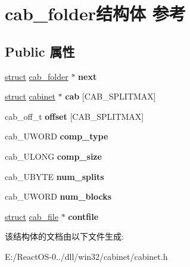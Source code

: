 \hypertarget{structcab__folder}{}\section{cab\+\_\+folder结构体 参考}
\label{structcab__folder}
\subsection*{Public 属性}
\begin{DoxyCompactItemize}
\item 
\mbox{\label{structcab__folder_a7cecba557234bb4262b10ebe0d312d08}} 
\hyperlink{interfacestruct}{struct} \hyperlink{structcab__folder}{cab\+\_\+folder} $\ast$ {\bfseries next}
\item 
\mbox{\label{structcab__folder_a139918c025426ee00b6b76bea4fbad54}} 
\hyperlink{interfacestruct}{struct} \hyperlink{structcabinet}{cabinet} $\ast$ {\bfseries cab} \mbox{[}C\+A\+B\+\_\+\+S\+P\+L\+I\+T\+M\+AX\mbox{]}
\item 
\mbox{\label{structcab__folder_a6f910b4d86e42803944d6dfcc3ba731c}} 
cab\+\_\+off\+\_\+t {\bfseries offset} \mbox{[}C\+A\+B\+\_\+\+S\+P\+L\+I\+T\+M\+AX\mbox{]}
\item 
\mbox{\label{structcab__folder_a0487eb076a10cbfc9f10215f3fb37c08}} 
cab\+\_\+\+U\+W\+O\+RD {\bfseries comp\+\_\+type}
\item 
\mbox{\label{structcab__folder_ae5afe17c2c84402de213b06db9e81874}} 
cab\+\_\+\+U\+L\+O\+NG {\bfseries comp\+\_\+size}
\item 
\mbox{\label{structcab__folder_a93d889c686edf306cecd0d72902e4fb1}} 
cab\+\_\+\+U\+B\+Y\+TE {\bfseries num\+\_\+splits}
\item 
\mbox{\label{structcab__folder_a272d92e4ef200a0ee0d696475c9b455a}} 
cab\+\_\+\+U\+W\+O\+RD {\bfseries num\+\_\+blocks}
\item 
\mbox{\label{structcab__folder_a5f2f80046430eb46a2f80c509d58c3e5}} 
\hyperlink{interfacestruct}{struct} \hyperlink{structcab__file}{cab\+\_\+file} $\ast$ {\bfseries contfile}
\end{DoxyCompactItemize}


该结构体的文档由以下文件生成\+:\begin{DoxyCompactItemize}
\item 
E\+:/\+React\+O\+S-\/0../dll/win32/cabinet/cabinet.\+h\end{DoxyCompactItemize}
